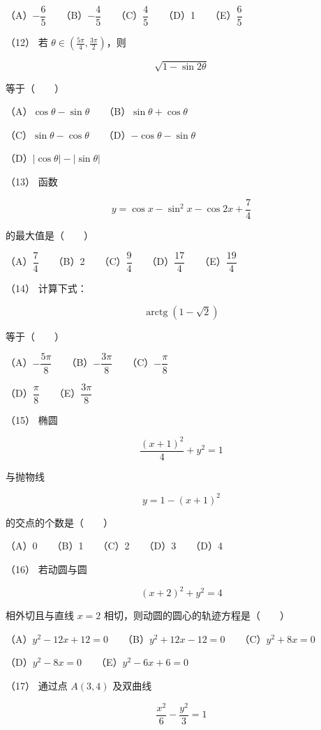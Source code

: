 \begin{answer}
（A）$-\dfrac65$　　（B）$-\dfrac45$　　（C）$\dfrac45$　　（D）1　　（E）$\dfrac65$

（12） 若 $\theta\in(\frac{5\pi}4,\frac{3\pi}2)$，则

\nopagebreak[4]
\[
\sqrt{1-\sin2\theta}
\]

等于\mbox{（　　）}

（A）$\cos\theta-\sin\theta$　　（B）$\sin\theta+\cos\theta$

（C）$\sin\theta-\cos\theta$　　（D）$-\cos\theta-\sin\theta$

（D）$|\cos\theta|-|\sin\theta|$

（13） 函数

\nopagebreak[4]
\[
y=\cos x-\sin^2x-\cos2x+\frac74
\]

的最大值是\mbox{（　　）}

（A）$\dfrac74$　　（B）2　　（C）$\dfrac94$　　（D）$\dfrac{17}4$　　（E）$\dfrac{19}4$

（14） 计算下式：

\nopagebreak[4]
\[
\operatorname{arctg}(1-\sqrt2)
\]

等于\mbox{（　　）}

（A）$-\dfrac{5\pi}8$　　（B）$-\dfrac{3\pi}8$　　（C）$-\dfrac\pi8$

（D）$\dfrac\pi8$　　（E）$\dfrac{3\pi}8$

（15） 椭圆

\nopagebreak[4]
\[
\frac{(x+1)^2}{4}+y^2=1
\]

与抛物线

\nopagebreak[4]
\[
y=1-(x+1)^2
\]

的交点的个数是\mbox{（　　）}

（A）0　　（B）1　　（C）2　　（D）3　　（D）4

（16） 若动圆与圆

\nopagebreak[4]
\[
(x+2)^2+y^2=4
\]

相外切且与直线 $x=2$ 相切，则动圆的圆心的轨迹方程是\mbox{（　　）}

（A）$y^2-12x+12=0$　　（B）$y^2+12x-12=0$　　（C）$y^2+8x=0$

（D）$y^2-8x=0$　　（E）$y^2-6x+6=0$

（17） 通过点 $A(3,4)$ 及双曲线

\nopagebreak[4]
\[
\frac{x^2}{6}-\frac{y^2}{3}=1
\]


\end{answer}
